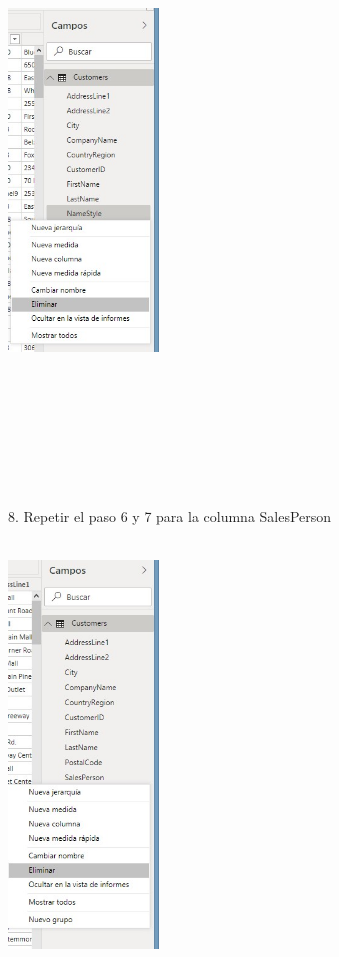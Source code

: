\begin{flushleft}
\begin{itemize}
\textbf{ }\\
\begin{center}
	\includegraphics[width=4cm]{./Imagenes/image9} 
	\end{center}
\textbf{ }\\


\textbf{ }\\
\textbf{ }\\
\textbf{ }\\
\textbf{ }\\
\textbf{ }\\
\textbf{ }\\
8. Repetir el paso 6 y 7 para la columna SalesPerson\\
\textbf{ }\\
\begin{center}
	\includegraphics[width=4cm]{./Imagenes/image10} 
	\end{center}
\textbf{ }\\


\end{itemize}
\end{flushleft}

